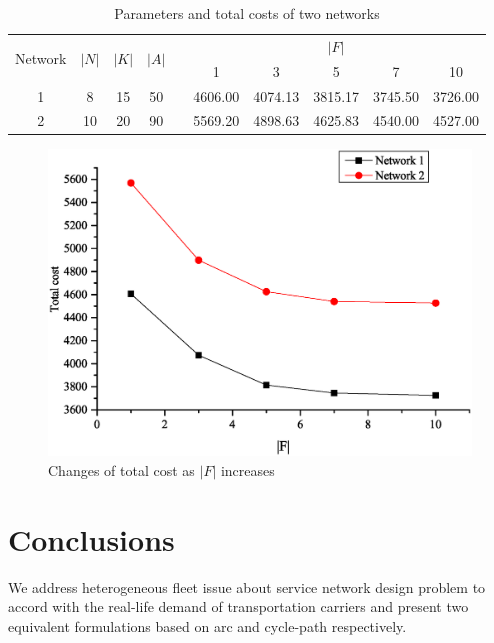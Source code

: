 \documentclass[11pt,nonblindrev,fleqn]{article}
\begin{document}
\begin{table}[H]
\setlength{\abovecaptionskip}{-3pt}
\setlength{\belowcaptionskip}{5pt}
\centering
  \footnotesize
  \caption{Parameters and total costs of two networks}
  \label{heterogeneous}

\begin{tabular}{cccccccccc}
\hline
\multirow{2}[4]{*}{Network} & \multirow{2}[4]{*}{$|N|$} & \multirow{2}[4]{*}{$|K|$} & \multirow{2}[4]{*}{$|A|$} &       & \multicolumn{5}{c}{$|F|$} \bigstrut\\
\cline{6-10}      &       &       &       &       & 1     & 3     & 5     & 7     & 10 \bigstrut\\
\hline
1     & 8     & 15    & 50    &       & 4606.00  & 4074.13  & 3815.17  & 3745.50  & 3726.00  \bigstrut[t]\\
2     & 10    & 20    & 90    &       & 5569.20  & 4898.63  & 4625.83  & 4540.00  & 4527.00  \bigstrut[b]\\
\hline
\end{tabular}%

\end{table}%

\begin{figure}[H]
\setlength{\abovecaptionskip}{-5pt}
\setlength{\belowcaptionskip}{-5pt}
\centering
\includegraphics[width=0.9\linewidth]{F6.eps}
\caption{Changes of total cost as $|F|$ increases}
\label{twoNetwork}
\end{figure}

\section{Conclusions}\label{conclusion}
We address heterogeneous fleet issue about service network design problem to accord with the real-life demand of transportation carriers and present two equivalent formulations based on arc and cycle-path respectively.
\end{document}

